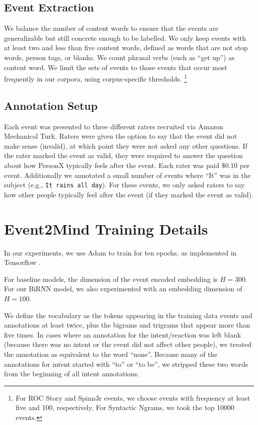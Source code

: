 \documentclass[11pt,a4paper]{article}
\begin{document}
\subsection{Event Extraction}
\label{ss:event_extraction_more}
We balance the number of content words to ensure that the events are generalizable but still concrete enough to be labelled.
We only keep events with at least two and less than five content words, defined as words that are not stop words, person tags, or blanks.
We count phrasal verbs (such as ``get up'') as content word.
We limit the sets of events to those events that occur most frequently in our corpora, using corpus-specific thresholds.
\footnote{For ROC Story and Spinn3r events, we choose events with frequency at least five and 100, respectively.
For Syntactic Ngrams, we took the top 10000 events. 
}


\subsection{Annotation Setup}
Each event was presented to three different  raters recruited via Amazon Mechanical Turk. Raters were given the option to say that the event did not make sense (invalid), at which point they were not asked any other questions. If the rater marked the event as valid, they were required to answer the question about how PersonX typically feels after the event. Each  rater was paid $\$0.10$ per event. Additionally we annotated a small number of events where ``It'' was in the subject (e.g., \texttt{It rains all day}). For these events, we only asked  raters to say how other people typically feel after the event (if they marked the event as valid). 


\section{Event2Mind Training Details}\label{sec:trainingdeets}
In our experiments, we use Adam to train for ten epochs, as implemented in Tensorflow \cite{tensorflow}. 

For baseline models, the dimension of the event encoded embedding is $H=300$.
For our BiRNN model, we also experimented with an embedding dimension of $H=100$. 


We define the vocabulary as the tokens appearing in the training data events and annotations at least twice, plus the bigrams and trigrams that appear more than five times.  In cases where an annotation for the intent/reaction was left blank (because there was no intent or the event did not affect other people), we treated the annotation as equivalent to the word ``none''.  Because many of the annotations for intent started with ``to'' or ``to be'', we stripped these two words from the beginning of all intent annotations.
\end{document}
